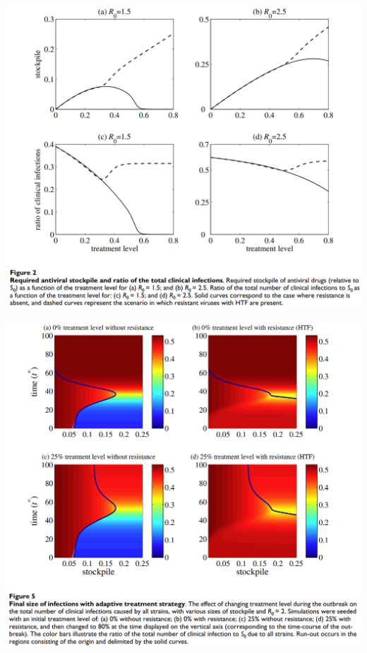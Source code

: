 \documentclass[aspectratio=169]{beamer}\usepackage[]{graphicx}\usepackage[]{xcolor}
\begin{document}
\begin{frame}
\centering
\includegraphics[height=\textheight]{FIGS/ABM-role-of-resistance}
\end{frame}

\begin{frame}
\centering
\includegraphics[height=\textheight]{FIGS/ABM-heatmaps}
\end{frame}
\end{document}
